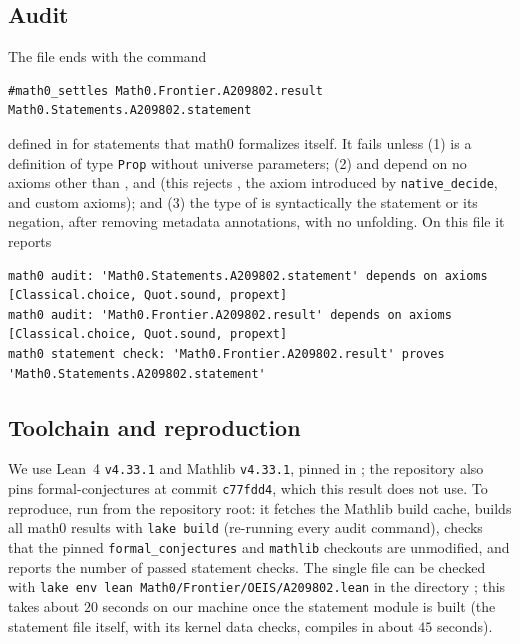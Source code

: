 \documentclass[11pt]{amsart}
\theoremstyle{plain}
\theoremstyle{definition}
\begin{document}
\subsection*{Audit}
The file ends with the command
\begin{lstlisting}
#math0_settles Math0.Frontier.A209802.result Math0.Statements.A209802.statement
\end{lstlisting}
defined in  for statements that math0 formalizes itself. It fails unless (1)  is a definition of type \texttt{Prop} without universe parameters; (2)  and  depend on no axioms other than ,  and  (this rejects , the axiom  introduced by \texttt{native\_decide}, and custom axioms); and (3) the type of  is syntactically the statement or its negation, after removing metadata annotations, with no unfolding. On this file it reports
\begin{lstlisting}
math0 audit: 'Math0.Statements.A209802.statement' depends on axioms [Classical.choice, Quot.sound, propext]
math0 audit: 'Math0.Frontier.A209802.result' depends on axioms [Classical.choice, Quot.sound, propext]
math0 statement check: 'Math0.Frontier.A209802.result' proves 'Math0.Statements.A209802.statement'
\end{lstlisting}

\subsection*{Toolchain and reproduction}
We use Lean~4 \cite{Lean4} \texttt{v4.33.1} and Mathlib \cite{Mathlib} \texttt{v4.33.1}, pinned in ; the repository also pins formal-conjectures \cite{FC} at commit \texttt{c77fdd4}, which this result does not use. To reproduce, run  from the repository root: it fetches the Mathlib build cache, builds all math0 results with \texttt{lake build} (re-running every audit command), checks that the pinned \texttt{formal\_conjectures} and \texttt{mathlib} checkouts are unmodified, and reports the number of passed statement checks. The single file can be checked with \texttt{lake env lean Math0/Frontier/OEIS/A209802.lean} in the directory ; this takes about $20$ seconds on our machine once the statement module is built (the statement file itself, with its kernel data checks, compiles in about $45$ seconds).
\end{document}
